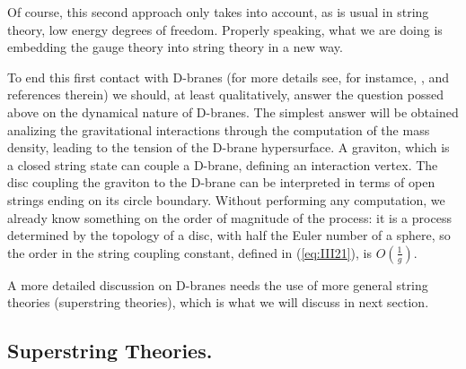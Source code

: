 Of course, this second approach only takes into account, as is
usual in string theory, low energy degrees of freedom. Properly
speaking, what we are doing is embedding the gauge theory into
string theory in a new way. 
  
To end this first contact with
D-branes (for more details see, for instamce, \cite{Polchinski}, 
and references therein) we should, at least qualitatively, answer the question
possed above on the dynamical nature of D-branes. The simplest
answer will be obtained analizing the gravitational interactions
through the computation of the mass density, leading to the
tension of the D-brane hypersurface. A graviton, which is a
closed string state can couple a D-brane, defining an interaction
vertex. The disc coupling the graviton to the D-brane can be
interpreted in terms of open strings ending on its circle boundary.
Without performing any computation, we already know something on
the order of magnitude of the process: it is a process determined
by the topology of a disc, with half the Euler number of a
sphere, so the order in the string coupling constant, defined in
(\ref{eq:III21}), is $O(\frac {1}{g})$.
  
A more detailed discussion on D-branes needs the use of more
general string theories (superstring theories), which is what we
will discuss in next section.

\subsection{Superstring Theories.}

